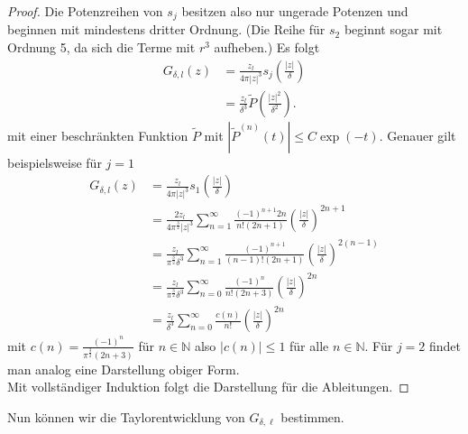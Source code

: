 \documentclass[12pt,a4paper]{scrartcl}
\numberwithin{equation}{section}
\newcommand{\N}{\mathbb{N}} %
\begin{document}
\begin{proof}
Die Potenzreihen von $s_j$ besitzen also nur ungerade Potenzen und beginnen mit mindestens dritter Ordnung. (Die Reihe für $s_2$ beginnt sogar mit Ordnung 5, da sich die Terme mit $r^3$ aufheben.)  Es folgt
\begin{align*}
G_{\delta,l}(z) &= \frac{z_l}{4 \pi |z|^3} s_j \left( \frac{|z|}{\delta}\right) \\
&= \frac{z_l}{\delta^3}\tilde P \left(\frac{|z|^2}{\delta^2}\right).
\end{align*}
mit einer beschränkten Funktion $\tilde P$ mit $|\tilde P^{(n)}(t)|\leq C \exp(-t)$. Genauer gilt beispielsweise für $j=1$
\begin{align*}
G_{\delta,l}(z) &= \frac{z_l}{4 \pi |z|^3} s_1 \left( \frac{|z|}{\delta}\right) \\
&= \frac{2 z_l}{4\pi^{\frac{3}{2}}|z|^3}\sum_{n=1}^\infty \frac{(-1)^{n+1}2n}{n!(2n +1)} \left(\frac{|z|}{\delta}\right)^{2 n +1} \\
&= \frac{z_l}{\pi^{\frac{3}{2}}\delta^3}\sum_{n=1}^\infty \frac{(-1)^{n+1}}{(n-1)!(2n +1)} \left(\frac{|z|}{\delta}\right)^{2(n - 1)} \\
&= \frac{z_l}{\pi^{\frac{3}{2}}\delta^3}\sum_{n=0}^\infty \frac{(-1)^{n}}{n!(2n +3)} \left(\frac{|z|}{\delta}\right)^{2n} \\ 
&=\frac{ z_l}{\delta^3}\sum_{n=0}^\infty \frac{c(n)}{n!} \left(\frac{|z|}{\delta}\right)^{2n}
\end{align*}
mit $c(n) = \frac{(-1)^n}{\pi^{\frac{3}{2}}(2n+3)}$ für $n\in\N$ also $|c(n)|\leq 1$ für alle $n \in \N$. Für $j=2$ findet man analog eine Darstellung obiger Form.\\
Mit vollständiger Induktion folgt die Darstellung für die Ableitungen.
\end{proof}
Nun können wir die Taylorentwicklung von $G_{\delta,\ell}$ bestimmen.
\end{document}
